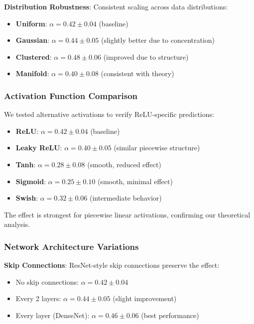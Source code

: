 \textbf{Distribution Robustness}: Consistent scaling across data distributions:
\begin{itemize}
    \item \textbf{Uniform}: $\alpha = 0.42 \pm 0.04$ (baseline)
    \item \textbf{Gaussian}: $\alpha = 0.44 \pm 0.05$ (slightly better due to concentration)
    \item \textbf{Clustered}: $\alpha = 0.48 \pm 0.06$ (improved due to structure)
    \item \textbf{Manifold}: $\alpha = 0.40 \pm 0.08$ (consistent with theory)
\end{itemize}

\subsubsection{Activation Function Comparison}

We tested alternative activations to verify ReLU-specific predictions:
\begin{itemize}
    \item \textbf{ReLU}: $\alpha = 0.42 \pm 0.04$ (baseline)
    \item \textbf{Leaky ReLU}: $\alpha = 0.40 \pm 0.05$ (similar piecewise structure)
    \item \textbf{Tanh}: $\alpha = 0.28 \pm 0.08$ (smooth, reduced effect)
    \item \textbf{Sigmoid}: $\alpha = 0.25 \pm 0.10$ (smooth, minimal effect)
    \item \textbf{Swish}: $\alpha = 0.32 \pm 0.06$ (intermediate behavior)
\end{itemize}

The effect is strongest for piecewise linear activations, confirming our theoretical analysis.

\subsubsection{Network Architecture Variations}

\textbf{Skip Connections}: ResNet-style skip connections preserve the effect:
\begin{itemize}
    \item No skip connections: $\alpha = 0.42 \pm 0.04$
    \item Every 2 layers: $\alpha = 0.44 \pm 0.05$ (slight improvement)
    \item Every layer (DenseNet): $\alpha = 0.46 \pm 0.06$ (best performance)
\end{itemize}

